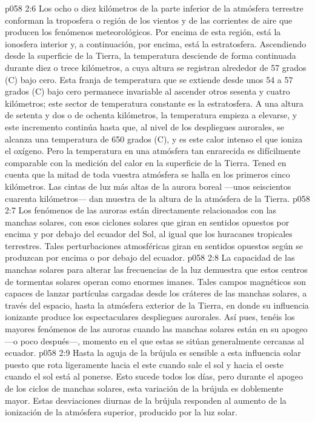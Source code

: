 \vs p058 2:6 \pc Los ocho o diez kilómetros de la parte inferior de la atmósfera terrestre conforman la troposfera o región de los vientos y de las corrientes de aire que producen los fenómenos meteorológicos. Por encima de esta región, está la ionosfera interior y, a continuación, por encima, está la estratosfera. Ascendiendo desde la superficie de la Tierra, la temperatura desciende de forma continuada durante diez o trece kilómetros, a cuya altura se registran alrededor de 57 grados (C) bajo cero. Esta franja de temperatura que se extiende desde unos 54 a 57 grados (C) bajo cero permanece invariable al ascender otros sesenta y cuatro kilómetros; este sector de temperatura constante es la estratosfera. A una altura de setenta y dos o de ochenta kilómetros, la temperatura empieza a elevarse, y este incremento continúa hasta que, al nivel de los despliegues aurorales, se alcanza una temperatura de 650 grados (C), y es este calor intenso el que ioniza el oxígeno. Pero la temperatura en una atmósfera tan enrarecida es difícilmente comparable con la medición del calor en la superficie de la Tierra. Tened en cuenta que la mitad de toda vuestra atmósfera se halla en los primeros cinco kilómetros. Las cintas de luz más altas de la aurora boreal ---unos seiscientos cuarenta kilómetros--- dan muestra de la altura de la atmósfera de la Tierra.
\vs p058 2:7 Los fenómenos de las auroras están directamente relacionados con las manchas solares, con esos ciclones solares que giran en sentidos opuestos por encima y por debajo del ecuador del Sol, al igual que los huracanes tropicales terrestres. Tales perturbaciones atmosféricas giran en sentidos opuestos según se produzcan por encima o por debajo del ecuador.
\vs p058 2:8 La capacidad de las manchas solares para alterar las frecuencias de la luz demuestra que estos centros de tormentas solares operan como enormes imanes. Tales campos magnéticos son capaces de lanzar partículas cargadas desde los cráteres de las manchas solares, a través del espacio, hasta la atmósfera exterior de la Tierra, en donde su influencia ionizante produce los espectaculares despliegues aurorales. Así pues, tenéis los mayores fenómenos de las auroras cuando las manchas solares están en su apogeo ---o poco después---, momento en el que estas se sitúan generalmente cercanas al ecuador.
\vs p058 2:9 Hasta la aguja de la brújula es sensible a esta influencia solar puesto que rota ligeramente hacia el este cuando sale el sol y hacia el oeste cuando el sol está al ponerse. Esto sucede todos los días, pero durante el apogeo de los ciclos de manchas solares, esta variación de la brújula es doblemente mayor. Estas desviaciones diurnas de la brújula responden al aumento de la ionización de la atmósfera superior, producido por la luz solar.
